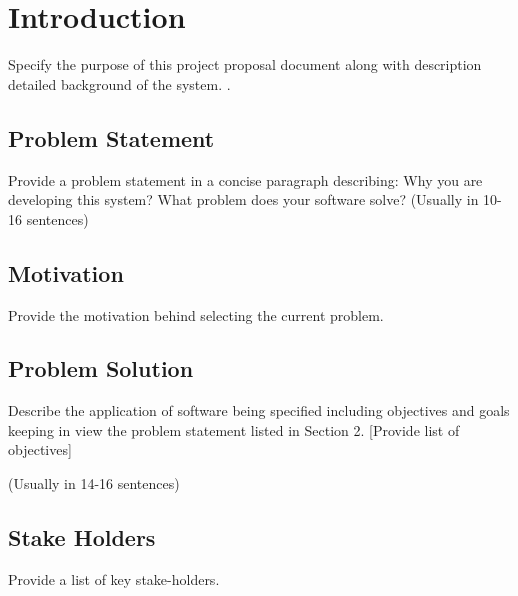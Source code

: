 \chapter{Introduction}
\label{sec:introduction}
Specify the purpose of this project proposal document along with description detailed background of the system. \cite{test}.

\section{Problem Statement}

Provide a problem statement in a concise paragraph describing:
Why you are developing this system? 
What problem does your software solve? 
(Usually in 10-16 sentences)

\section{Motivation}
Provide the motivation behind selecting the current problem.

\section{Problem Solution}
Describe the application of software being specified including objectives and goals keeping in view the problem statement listed in Section 2. 
[Provide list of objectives]

(Usually in 14-16 sentences)
\section{Stake Holders}
Provide a list of key stake-holders.


